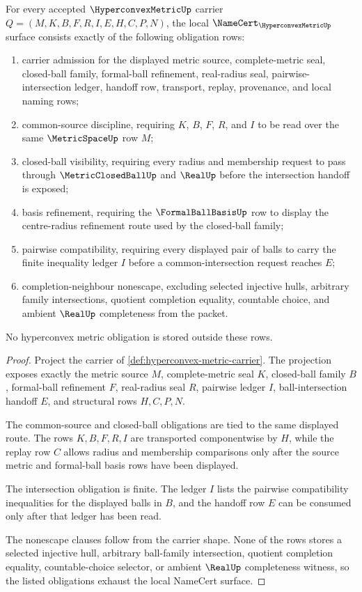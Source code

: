 \begin{theorem}\label{thm:hyperconvex-metric-namecert-obligations}
For every accepted $\HyperconvexMetricUp$ carrier $Q=(M,K,B,F,R,I,E,H,C,P,N)$, the local $\NameCert_{\HyperconvexMetricUp}$ surface consists exactly of the following obligation rows:
\begin{enumerate}
\item carrier admission for the displayed metric source, complete-metric seal, closed-ball family, formal-ball refinement, real-radius seal, pairwise-intersection ledger, handoff row, transport, replay, provenance, and local naming rows;
\item common-source discipline, requiring $K$, $B$, $F$, $R$, and $I$ to be read over the same $\MetricSpaceUp$ row $M$;
\item closed-ball visibility, requiring every radius and membership request to pass through $\MetricClosedBallUp$ and $\RealUp$ before the intersection handoff is exposed;
\item basis refinement, requiring the $\FormalBallBasisUp$ row to display the centre-radius refinement route used by the closed-ball family;
\item pairwise compatibility, requiring every displayed pair of balls to carry the finite inequality ledger $I$ before a common-intersection request reaches $E$;
\item completion-neighbour nonescape, excluding selected injective hulls, arbitrary family intersections, quotient completion equality, countable choice, and ambient $\RealUp$ completeness from the packet.
\end{enumerate}
No hyperconvex metric obligation is stored outside these rows.
\end{theorem}
\begin{proof}
Project the carrier of \autoref{def:hyperconvex-metric-carrier}. The projection exposes exactly the metric source $M$, complete-metric seal $K$, closed-ball family $B$, formal-ball refinement $F$, real-radius seal $R$, pairwise ledger $I$, ball-intersection handoff $E$, and structural rows $H,C,P,N$.

The common-source and closed-ball obligations are tied to the same displayed route. The rows $K,B,F,R,I$ are transported componentwise by $H$, while the replay row $C$ allows radius and membership comparisons only after the source metric and formal-ball basis rows have been displayed.

The intersection obligation is finite. The ledger $I$ lists the pairwise compatibility inequalities for the displayed balls in $B$, and the handoff row $E$ can be consumed only after that ledger has been read.

The nonescape clauses follow from the carrier shape. None of the rows stores a selected injective hull, arbitrary ball-family intersection, quotient completion equality, countable-choice selector, or ambient $\RealUp$ completeness witness, so the listed obligations exhaust the local NameCert surface.
\end{proof}

